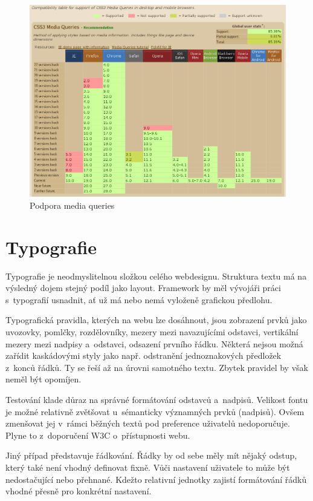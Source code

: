 \documentclass[thesis=B,czech]{FITthesis}[2012/06/26]
\begin{document}
\begin{figure}[h]
	\begin{center}
	\includegraphics[scale=0.55]{images/image20.png}
	\end{center}
	\caption{Podpora media queries}
	\label{imgMQ}
\end{figure}


\newpage
\section{Typografie}


Typografie je neodmyslitelnou složkou celého webdesignu. Struktura textu má na výsledný dojem stejný podíl jako layout. Framework by měl vývojáři práci s~typografií usnadnit, ať už má nebo nemá vyloženě grafickou předlohu.

Typografická pravidla, kterých na webu lze dosáhnout, jsou zobrazení prvků jako uvozovky, pomlčky, rozdělovníky, mezery mezi navazujícími odstavci, vertikální mezery mezi nadpisy a~odstavci, odsazení prvního řádku. Některá nejsou možná zařídit kaskádovými styly jako např. odstranění jednoznakových předložek z~konců řádků. Ty se řeší až na úrovni samotného textu. Zbytek pravidel by však neměl být opomíjen.

Testování klade důraz na správné formátování odstavců a~nadpisů. Velikost fontu je možné relativně zvětšovat u~sémanticky významných prvků (nadpisů). Ovšem zmenšovat jej v~rámci běžných textů pod
preference uživatelů nedoporučuje. Plyne to z~doporučení \gls{W3C} o~přístupnosti webu.\cite{wcag} 

Jiný případ představuje řádkování. Řádky by od sebe měly mít nějaký odstup, který také není vhodný definovat fixně. Vůči nastavení uživatele to může být nedostačující nebo přehnané. Kdežto relativní jednotky zajistí formátování řádků vhodné přesně pro konkrétní nastavení. 
\end{document}

